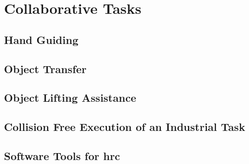 \chapter{Collaborative Tasks}
\label{chapter:colab-tasks}

\section{Hand Guiding}

\section{Object Transfer}

\section{Object Lifting Assistance}

\section{Collision Free Execution of an Industrial Task}

\section{Software Tools for \acs{hrc}}
\label{sec:tools-hrc}